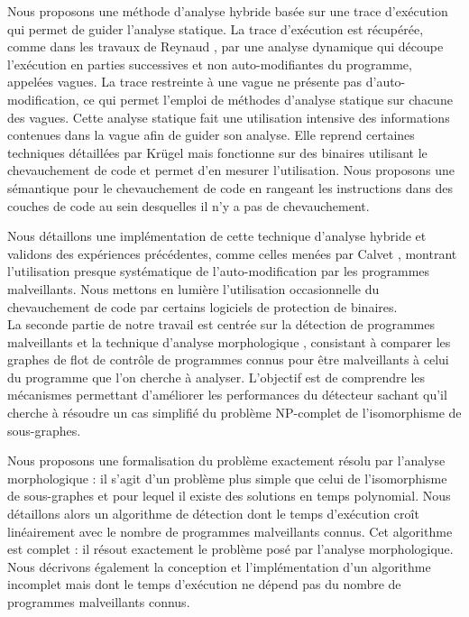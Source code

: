 
Nous proposons une méthode d'analyse hybride basée sur une trace d'exécution qui permet de guider l'analyse statique.
La trace d'exécution est récupérée, comme dans les travaux de Reynaud \cite{Reynaud2010}, par une analyse dynamique qui découpe l'exécution en parties successives et non auto-modifiantes du programme, appelées vagues.
La trace restreinte à une vague ne présente pas d'auto-modification, ce qui permet l'emploi de méthodes d'analyse statique sur chacune des vagues.
Cette analyse statique fait une utilisation intensive des informations contenues dans la vague afin de guider son analyse.
Elle reprend certaines techniques détaillées par Krügel \cite{KruegelRVV04} mais fonctionne sur des binaires utilisant le chevauchement de code et permet d'en mesurer l'utilisation. Nous proposons une sémantique pour le chevauchement de code en rangeant les instructions dans des couches de code au sein desquelles il n'y a pas de chevauchement.

Nous détaillons une implémentation de cette technique d'analyse hybride et validons des expériences précédentes, comme celles menées par Calvet  \cite{Calvet2013}, montrant l'utilisation presque systématique de l'auto-modification par les programmes malveillants.
Nous mettons en lumière l'utilisation occasionnelle du chevauchement de code par certains logiciels de protection de binaires.%
\\

La seconde partie de notre travail est centrée sur la détection de programmes malveillants et la technique d'analyse morphologique \cite{BKM08}, consistant à comparer les graphes de flot de contrôle de programmes connus pour être malveillants à celui du programme que l'on cherche à analyser.
L'objectif est de comprendre les mécanismes permettant d'améliorer les performances du détecteur sachant qu'il cherche à résoudre un cas simplifié du problème NP-complet de l'isomorphisme de sous-graphes.


Nous proposons une formalisation du problème exactement résolu par l'analyse morphologique : il s'agit d'un problème plus simple que celui de l'isomorphisme de sous-graphes et pour lequel il existe des solutions en temps polynomial.
Nous détaillons alors un algorithme de détection dont le temps d'exécution croît linéairement avec le nombre de programmes malveillants connus. Cet algorithme est complet : il résout exactement le problème posé par l'analyse morphologique.
Nous décrivons également la conception et l'implémentation d'un algorithme incomplet mais dont le temps d'exécution ne dépend pas du nombre de programmes malveillants connus.
\\

